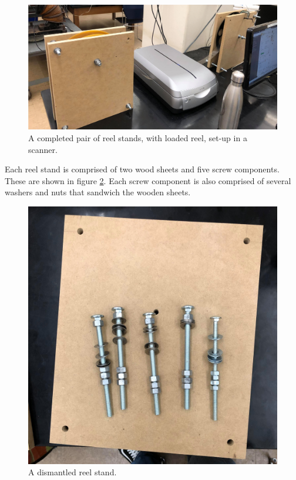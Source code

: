 \documentclass[12pt]{article} %
\begin{document}
\begin{figure}[H]
    \centering
    \includegraphics[width=0.7\linewidth]{Images/Reel stand images/reelstandaction.jpg}
    \caption{A completed pair of reel stands, with loaded reel, set-up in a scanner.}
    \label{fig: reelsstandsinaction}
\end{figure}

Each reel stand is comprised of two wood sheets and five screw components. These are shown in figure \ref{fig: reelstanddismantled}. Each screw component is also comprised of several washers and nuts that sandwich the wooden sheets.
\begin{figure}[H]
    \centering
    \includegraphics[width=0.7\linewidth]{Images/Reel stand images/reelstanddismantled.jpg}
    \caption{A dismantled reel stand.}
    \label{fig: reelstanddismantled}
\end{figure}
\end{document}
